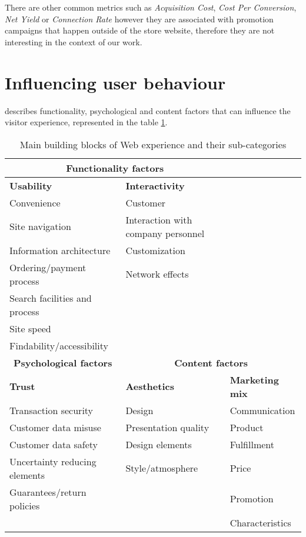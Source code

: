 There are other common metrics such as \textit{Acquisition Cost}, \textit{Cost 
Per Conversion}, \textit{Net Yield} or \textit{Connection Rate} however they 
are associated with promotion campaigns that happen outside of the store 
website, therefore they are not interesting in the context of our work.

\section{Influencing user behaviour}

\cite{Constantinides2004} describes functionality, psychological and content 
factors that can influence the visitor experience, represented in the table 
\ref{tab:factors}.

\begin{table}[h]
    \centering
    \caption{Main building blocks of Web experience and their sub-categories 
    \cite{Constantinides2004}}
    \label{tab:factors}
    \begin{tabular}{@{}lll@{}}
\toprule
\multicolumn{2}{c}{\textbf{Functionality factors}} & \textbf{} \\ \midrule
\textbf{Usability} & \textbf{Interactivity} & \textbf{} \\ \midrule
Convenience & Customer &  \\
Site navigation & Interaction with company personnel &  \\
Information architecture & Customization &  \\
Ordering/payment process & Network effects &  \\
Search facilities and process &  &  \\
Site speed &  &  \\
Findability/accessibility &  &  \\ \midrule
\multicolumn{1}{c}{\textbf{Psychological factors}} & 
\multicolumn{2}{c}{\textbf{Content factors}} 
\\ \midrule
\textbf{Trust} & \textbf{Aesthetics} & \textbf{Marketing mix} \\ \midrule
Transaction security & Design & Communication \\
Customer data misuse & Presentation quality & Product \\
Customer data safety & Design elements & Fulfillment \\
Uncertainty reducing elements & Style/atmosphere & Price \\
Guarantees/return policies &  & Promotion \\
&  & Characteristics \\ \bottomrule
    \end{tabular}
\end{table}

